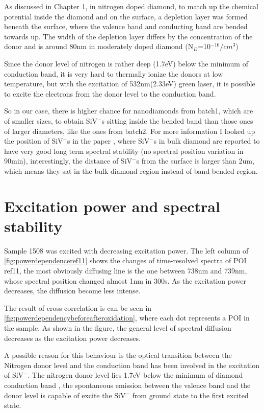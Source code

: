 As discussed in Chapter 1, in nitrogen doped diamond, to match up the chemical potential inside the diamond and on the surface, a depletion layer was formed beneath the surface, where the valence band and conducting band are bended towards up. The width of the depletion layer differs by the concentration of the donor and is around 80nm in moderately doped diamond (N$_{D}$=10$^{-16}/cm^{3}$) \cite{diederich_electron_1998}

Since the donor level of nitrogen is rather deep (1.7eV) below the minimum of conduction band, it is very hard to thermally ionize the donors at low temperature, but with the excitation of 532nm(2.33eV) green laser, it is possible to excite the electrons from the donor level to the conduction band. 

So in our case, there is higher chance for nanodiamonds from batch1, which are of smaller sizes, to obtain SiV$^{-}$s sitting inside the bended band than those ones of larger diameters, like the ones from batch2. For more information I looked up the position of SiV$^{-}$s in the paper \cite{rogers_multiple_2013}, where SiV$^{-}$s in bulk diamond are reported to have very good long term spectral stability (no spectral position variation in 90min), interestingly, the distance of SiV$^{-}$s from the surface is larger than 2um, which means they sat in the bulk diamond region instead of band bended region. 


\section{Excitation power and spectral stability}

Sample 1508 was excited with decreasing excitation power. The left column of \ref{fig:powerdependenceref11} shows the changes of time-resolved spectra of POI ref11, the most obviously diffusing line is the one between 738nm and 739nm, whose spectral position changed almost 1nm in 300s. As the excitation power decreases, the diffusion become less intense.

The result of cross correlation is can be seen in \ref{fig:powerdependencybeforeafteroxidation}, where each dot represents a POI in the sample. As shown in the figure, the general level of spectral diffusion decreases as the excitation power decreases. 

A possible reason for this behaviour is the optical transition between the Nitrogen donor level and the conduction band has been involved in the excitation of SiV$^{-}$. The nitrogen donor level lies 1.7eV below the minimum of diamond conduction band \cite{diederich_electron_1998}, the spontaneous emission between the valence band and the donor level is capable of excite the SiV$^{-}$ from ground state to the first excited state.

